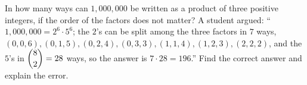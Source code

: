 In how many ways can $1{,}000{,}000$ be written as a product of three positive integers, if the order of the factors does not matter? A student argued: ``$1{,}000{,}000=2^6\cdot5^6$; the $2$'s can be split among the three factors in $7$ ways, $(0,0,6),(0,1,5),(0,2,4),(0,3,3),(1,1,4),(1,2,3),(2,2,2)$, and the $5$'s in $\dbinom82=28$ ways, so the answer is $7\cdot28=196$.'' Find the correct answer and explain the error.
